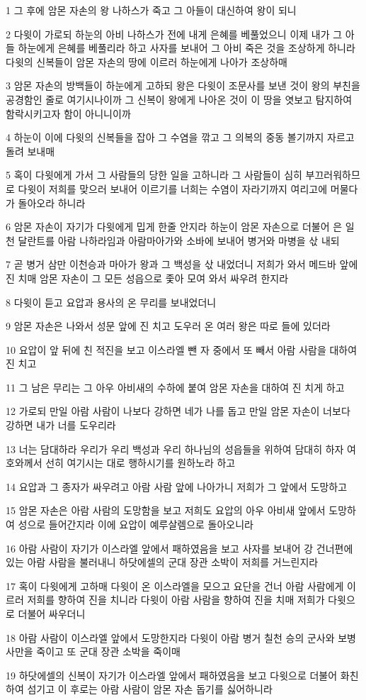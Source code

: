 \par 1 그 후에 암몬 자손의 왕 나하스가 죽고 그 아들이 대신하여 왕이 되니
\par 2 다윗이 가로되 하눈의 아비 나하스가 전에 내게 은혜를 베풀었으니 이제 내가 그 아들 하눈에게 은혜를 베풀리라 하고 사자를 보내어 그 아비 죽은 것을 조상하게 하니라 다윗의 신복들이 암몬 자손의 땅에 이르러 하눈에게 나아가 조상하매
\par 3 암몬 자손의 방백들이 하눈에게 고하되 왕은 다윗이 조문사를 보낸 것이 왕의 부친을 공경함인 줄로 여기시나이까 그 신복이 왕에게 나아온 것이 이 땅을 엿보고 탐지하여 함락시키고자 함이 아니니이까
\par 4 하눈이 이에 다윗의 신복들을 잡아 그 수염을 깎고 그 의복의 중동 볼기까지 자르고 돌려 보내매
\par 5 혹이 다윗에게 가서 그 사람들의 당한 일을 고하니라 그 사람들이 심히 부끄러워하므로 다윗이 저희를 맞으러 보내어 이르기를 너희는 수염이 자라기까지 여리고에 머물다가 돌아오라 하니라
\par 6 암몬 자손이 자기가 다윗에게 밉게 한줄 안지라 하눈이 암몬 자손으로 더불어 은 일천 달란트를 아람 나하라임과 아람마아가와 소바에 보내어 병거와 마병을 삯 내되
\par 7 곧 병거 삼만 이천승과 마아가 왕과 그 백성을 삯 내었더니 저희가 와서 메드바 앞에 진 치매 암몬 자손이 그 모든 성읍으로 좇아 모여 와서 싸우려 한지라
\par 8 다윗이 듣고 요압과 용사의 온 무리를 보내었더니
\par 9 암몬 자손은 나와서 성문 앞에 진 치고 도우러 온 여러 왕은 따로 들에 있더라
\par 10 요압이 앞 뒤에 친 적진을 보고 이스라엘 뺀 자 중에서 또 빼서 아람 사람을 대하여 진 치고
\par 11 그 남은 무리는 그 아우 아비새의 수하에 붙여 암몬 자손을 대하여 진 치게 하고
\par 12 가로되 만일 아람 사람이 나보다 강하면 네가 나를 돕고 만일 암몬 자손이 너보다 강하면 내가 너를 도우리라
\par 13 너는 담대하라 우리가 우리 백성과 우리 하나님의 성읍들을 위하여 담대히 하자 여호와께서 선히 여기시는 대로 행하시기를 원하노라 하고
\par 14 요압과 그 종자가 싸우려고 아람 사람 앞에 나아가니 저희가 그 앞에서 도망하고
\par 15 암몬 자손은 아람 사람의 도망함을 보고 저희도 요압의 아우 아비새 앞에서 도망하여 성으로 들어간지라 이에 요압이 예루살렘으로 돌아오니라
\par 16 아람 사람이 자기가 이스라엘 앞에서 패하였음을 보고 사자를 보내어 강 건너편에 있는 아람 사람을 불러내니 하닷에셀의 군대 장관 소박이 저희를 거느린지라
\par 17 혹이 다윗에게 고하매 다윗이 온 이스라엘을 모으고 요단을 건너 아람 사람에게 이르러 저희를 향하여 진을 치니라 다윗이 아람 사람을 향하여 진을 치매 저희가 다윗으로 더불어 싸우더니
\par 18 아람 사람이 이스라엘 앞에서 도망한지라 다윗이 아람 병거 칠천 승의 군사와 보병 사만을 죽이고 또 군대 장관 소박을 죽이매
\par 19 하닷에셀의 신복이 자기가 이스라엘 앞에서 패하였음을 보고 다윗으로 더불어 화친하여 섬기고 이 후로는 아람 사람이 암몬 자손 돕기를 싫어하니라

